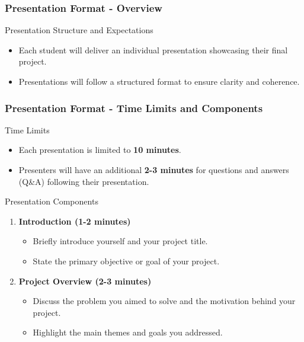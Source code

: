 \documentclass[aspectratio=169]{beamer}
\begin{document}
\begin{frame}[fragile]
    \frametitle{Presentation Format - Overview}
    \begin{block}{Presentation Structure and Expectations}
        \begin{itemize}
            \item Each student will deliver an individual presentation showcasing their final project.
            \item Presentations will follow a structured format to ensure clarity and coherence.
        \end{itemize}
    \end{block}
\end{frame}

\begin{frame}[fragile]
    \frametitle{Presentation Format - Time Limits and Components}
    \begin{block}{Time Limits}
        \begin{itemize}
            \item Each presentation is limited to \textbf{10 minutes}.
            \item Presenters will have an additional \textbf{2-3 minutes} for questions and answers (Q\&A) following their presentation.
        \end{itemize}
    \end{block}
    
    \begin{block}{Presentation Components}
        \begin{enumerate}
            \item \textbf{Introduction (1-2 minutes)}
                \begin{itemize}
                    \item Briefly introduce yourself and your project title.
                    \item State the primary objective or goal of your project.
                \end{itemize}
                
            \item \textbf{Project Overview (2-3 minutes)}
                \begin{itemize}
                    \item Discuss the problem you aimed to solve and the motivation behind your project.
                    \item Highlight the main themes and goals you addressed.
                \end{itemize}
                

\end{enumerate}
\end{block}
\end{frame}
\end{document}
